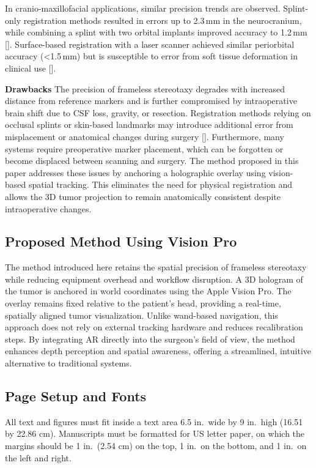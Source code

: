 \documentclass[12pt]{spieman}  %
\begin{document}
\begin{spacing}{2}
In cranio-maxillofacial applications, similar precision trends are observed. Splint-only registration methods resulted in errors up to 2.3 mm in the neurocranium, while combining a splint with two orbital implants improved accuracy to 1.2 mm [\cite{Luebbers08}]. Surface-based registration with a laser scanner achieved similar periorbital accuracy (<1.5 mm) but is susceptible to error from soft tissue deformation in clinical use [\cite{Luebbers08}].

\textbf{Drawbacks}
The precision of frameless stereotaxy degrades with increased distance from reference markers and is further compromised by intraoperative brain shift due to CSF loss, gravity, or resection. Registration methods relying on occlusal splints or skin-based landmarks may introduce additional error from misplacement or anatomical changes during surgery [\cite{Luebbers08}]. Furthermore, many systems require preoperative marker placement, which can be forgotten or become displaced between scanning and surgery. The method proposed in this paper addresses these issues by anchoring a holographic overlay using vision-based spatial tracking. This eliminates the need for physical registration and allows the 3D tumor projection to remain anatomically consistent despite intraoperative changes. 

 

\subsection{Proposed Method Using Vision Pro }

The method introduced here retains the spatial precision of frameless stereotaxy while reducing equipment overhead and workflow disruption. A 3D hologram of the tumor is anchored in world coordinates using the Apple Vision Pro. The overlay remains fixed relative to the patient’s head, providing a real-time, spatially aligned tumor visualization. Unlike wand-based navigation, this approach does not rely on external tracking hardware and reduces recalibration steps. By integrating AR directly into the surgeon’s field of view, the method enhances depth perception and spatial awareness, offering a streamlined, intuitive alternative to traditional systems.  

\subsection{Page Setup and Fonts}

All text and figures must fit inside a text area 6.5 in.\ wide by 9 in.\ high (16.51 by 22.86 cm). Manuscripts must be formatted for US letter paper, on which the margins should be 1 in.\ (2.54 cm) on the top, 1 in.\ on the bottom, and 1 in.\ on the left and right. 


\end{spacing}
\end{document}
